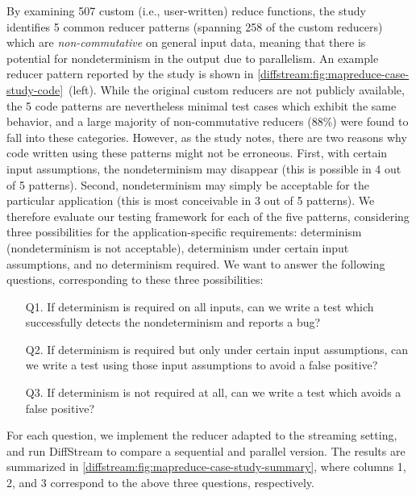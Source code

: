 By examining 507 custom (i.e., user-written) reduce functions, the study identifies 5 common reducer patterns (spanning 258 of the custom reducers) which are \emph{non-commutative} on general input data, meaning that there is potential for nondeterminism in the output due to parallelism.
An example reducer pattern reported by the study is shown in \cref{diffstream:fig:mapreduce-case-study-code}~(left).
While the original custom reducers are not publicly available, the 5 code patterns are nevertheless minimal test cases which exhibit the same behavior, and a large majority of non-commutative reducers (88\%) were found to fall into these categories.
However, as the study notes, there are two reasons why code written using these patterns might not be erroneous. First, with certain input assumptions, the nondeterminism may disappear (this is possible in 4 out of 5 patterns). Second, nondeterminism may simply be acceptable for the particular application (this is most conceivable in 3 out of 5 patterns).
We therefore evaluate our testing framework for each of the five patterns, considering three possibilities for the application-specific requirements: determinism (nondeterminism is not acceptable), determinism under certain
input assumptions, and no determinism required. We want to answer the following questions, corresponding to these three possibilities:
\begin{enumerate}
\item[Q1.] If determinism is required on all inputs, can we write a test which successfully detects the nondeterminism and reports a bug?
\item[Q2.] If determinism is required but only under certain input assumptions, can we write a test using those input assumptions to avoid a false positive?
\item[Q3.] If determinism is not required at all, can we write a test which avoids a false positive?
\end{enumerate}
For each question, we implement the reducer adapted to the streaming setting, and run DiffStream to compare a sequential and parallel version.
The results are summarized in \cref{diffstream:fig:mapreduce-case-study-summary}, where columns 1, 2, and 3 correspond to the above three questions, respectively.

